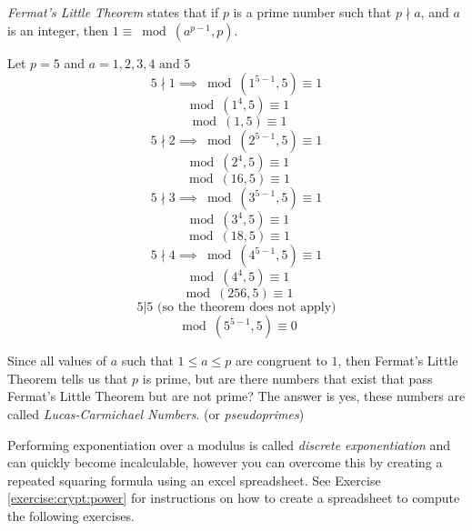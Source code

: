  \emph{Fermat's Little Theorem} states that if $p$ is a prime number such that $p \nmid a$, and $a$ is an integer, then $1 \equiv \bmod(a^{p-1}, p)$.

\begin{eg} Let $p = 5$ and $a = 1, 2, 3, 4 \text{ and } 5$
$$ 5 \nmid 1 \implies \bmod(1^{5-1}, 5) \equiv 1$$
$$ \bmod(1^{4}, 5) \equiv 1$$
$$ \bmod(1, 5) \equiv 1$$
$$ 5 \nmid 2 \implies \bmod(2^{5-1}, 5) \equiv 1$$
$$ \bmod(2^{4}, 5) \equiv 1$$
$$ \bmod(16, 5) \equiv 1$$
$$ 5 \nmid 3 \implies \bmod(3^{5-1}, 5) \equiv 1$$
$$ \bmod(3^{4}, 5) \equiv 1$$
$$ \bmod(18	, 5) \equiv 1$$
$$ 5 \nmid 4 \implies \bmod(4^{5-1}, 5) \equiv 1$$
$$ \bmod(4^{4}, 5) \equiv 1$$
$$ \bmod(256, 5) \equiv 1$$
$$ 5 | 5 \text { (so the theorem does not apply)}$$
$$ \bmod(5^{5-1}, 5) \equiv 0$$
\end{eg}
Since all values of $a$ such that $1 \leq a \leq p$ are congruent to $1$, then Fermat's Little Theorem tells us that $p$ is prime, but are there numbers that exist that pass Fermat's Little Theorem but are not prime?  The answer is yes, these numbers are called \emph{Lucas-Carmichael Numbers}.  (or \emph{pseudoprimes}) 

Performing exponentiation over a modulus is called \emph{discrete exponentiation} and can quickly become incalculable, however you can overcome this by creating a repeated squaring formula using an excel spreadsheet.  See Exercise \ref{exercise:crypt:power} for instructions on how to create a spreadsheet to compute the following exercises.
 
